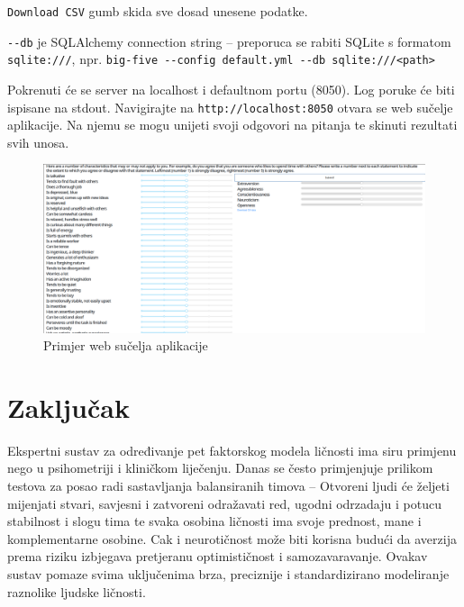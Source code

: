 \documentclass[times, utf8, seminar]{fer}
\begin{document}
\verb|Download CSV| gumb skida sve dosad unesene podatke.

\verb|--db| je SQLAlchemy connection string -- preporuca se rabiti SQLite s formatom \texttt{sqlite:///}, npr. \verb|big-five --config default.yml --db sqlite:///<path>|

Pokrenuti će se server na localhost i defaultnom portu (8050). Log poruke će biti ispisane na stdout. Navigirajte na \verb|http://localhost:8050| otvara se web sučelje aplikacije. Na njemu se mogu unijeti svoji odgovori na pitanja te skinuti rezultati svih unosa.

\begin{figure}[h]
    \caption{Primjer web sučelja aplikacije}
    \centering
    \includegraphics[width=\textwidth]{app}
\end{figure}
\chapter{Zaključak}

Ekspertni sustav za određivanje pet faktorskog modela ličnosti ima siru primjenu nego u psihometriji i kliničkom liječenju. Danas se često primjenjuje prilikom testova za posao radi sastavljanja balansiranih timova -- Otvoreni ljudi će željeti mijenjati stvari, savjesni i zatvoreni odražavati red, ugodni odrzadaju i potucu stabilnost i slogu tima te svaka osobina ličnosti ima svoje prednost, mane i komplementarne osobine. Cak i neurotičnost može biti korisna budući da averzija prema riziku izbjegava pretjeranu optimističnost i samozavaravanje.
Ovakav sustav pomaze svima uključenima brza, preciznije i standardizirano modeliranje raznolike ljudske ličnosti.



\end{document}
